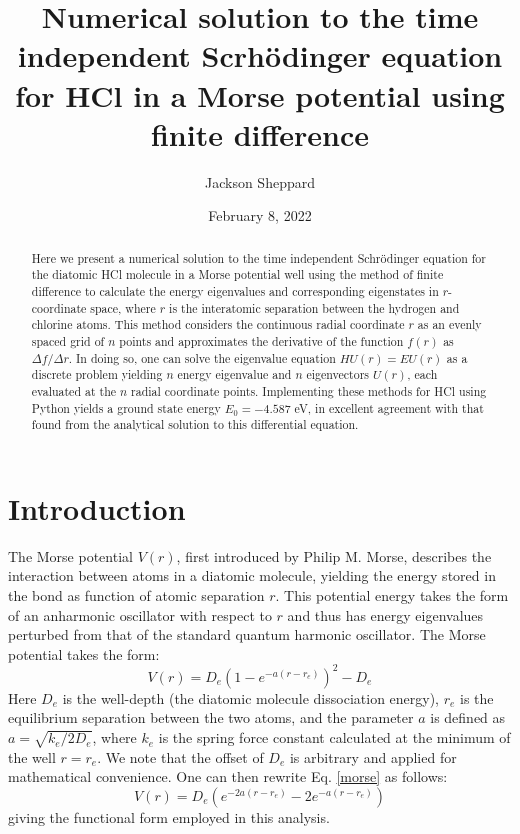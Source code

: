 \documentclass[%
aps, %
prl, %
preprint, %
12pt, %
amsfonts, %
amssymb, %
amsmath, %
endfloats,%
raggedbottom, %
]{revtex4-1}
\begin{document}

\title{Numerical solution to the time independent Scrhödinger equation for HCl in a Morse potential using finite difference}
\author{Jackson Sheppard}

\begin{abstract}
Here we present a numerical solution to the time independent Schrödinger equation for the diatomic HCl
molecule in a Morse potential well using the method of finite difference to calculate the energy
eigenvalues and corresponding eigenstates in $r$-coordinate space, where $r$ is the interatomic
separation between the hydrogen and chlorine atoms. This method considers the continuous radial
coordinate $r$ as an evenly spaced grid of $n$ points and approximates the derivative of the
function $f(r)$ as $\Delta f/ \Delta r$. In doing so, one can solve the eigenvalue equation
$HU(r) = EU(r)$ as a discrete problem yielding $n$ energy eigenvalue and $n$ eigenvectors $U(r)$, each
evaluated at the $n$ radial coordinate points. Implementing these methods for HCl using
Python yields a ground state energy $E_0 = -4.587$ eV, in excellent agreement with that found from
the analytical solution to this differential equation.
\end{abstract}

\date{February 8, 2022}
\maketitle

\section{\label{sec:Intro}Introduction}

The Morse potential $V(r)$, first introduced by Philip M. Morse, describes the interaction between
atoms in a diatomic molecule, yielding the energy stored in the bond as function of atomic
separation $r$. This potential energy takes the form of an anharmonic oscillator with respect to
$r$ and thus has energy eigenvalues perturbed from that of the standard quantum harmonic
oscillator. The Morse potential takes the form:
\begin{equation} \label{morse}
    V(r) = D_e(1 - e^{-a(r - r_e)})^2 - D_e
\end{equation}
Here $D_e$ is the well-depth (the diatomic molecule dissociation energy), $r_e$ is the equilibrium
separation between the two atoms, and the parameter $a$ is defined as $a = \sqrt{k_e/2D_e}$,
where $k_e$ is the spring force constant calculated at the minimum of the well $r = r_e$.
We note that the offset of $D_e$ is arbitrary and applied for mathematical convenience. One can 
then rewrite Eq. \ref{morse} as follows:
\begin{equation} \label{morse2}
    V(r) = D_e(e^{-2a(r-r_e)} - 2e^{-a(r-r_e)})    
\end{equation}
giving the functional form employed in this analysis.
\end{document}
